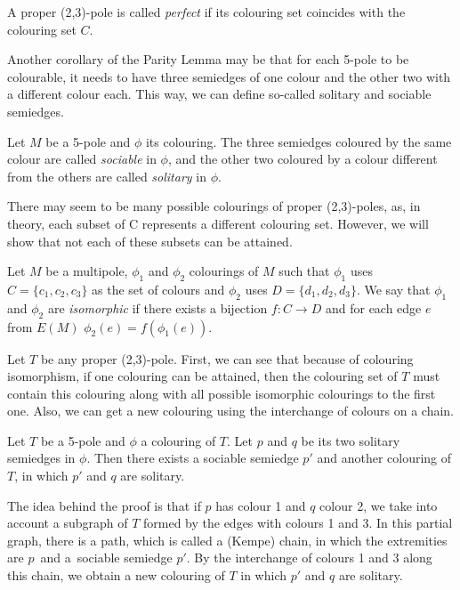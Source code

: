 \begin{definition}
	A proper (2,3)-pole is called \textit{perfect} if its colouring set coincides with the colouring set $C$.
\end{definition}

Another corollary of the Parity Lemma may be that for each 5-pole to be colourable, it needs to have three semiedges of one colour and the other two with a different colour each. This way, we can define so-called solitary and sociable semiedges.

\begin{definition}
	Let $M$ be a 5-pole and $\phi$ its colouring. The three semiedges coloured by the same colour are called \textit{sociable} in $\phi$, and the other two coloured by a colour different from the others are called \textit{solitary} in $\phi$.
\end{definition}

There may seem to be many possible colourings of proper (2,3)-poles, as, in theory, each subset of C represents a different colouring set. However, we will show that not each of these subsets can be attained.

Let $M$ be a multipole, $\phi_1$ and $\phi_2$ colourings of $M$ such that $\phi_1$ uses $C=\{c_1,c_2,c_3\}$ as the set of colours and $\phi_2$ uses $D=\{d_1,d_2,d_3\}$. We say that $\phi_1$ and $\phi_2$ are \textit{isomorphic} if there exists a bijection $f\colon C\rightarrow D$ and for each edge $e$ from $E(M)$ $\phi_2(e)=f(\phi_1(e))$.

Let $T$ be any proper (2,3)-pole. First, we can see that because of colouring isomorphism, if one colouring can be attained, then the colouring set of $T$ must contain this colouring along with all possible isomorphic colourings to the first one. Also, we can get a new colouring using the interchange of colours on a chain.

\begin{lemma}
	Let $T$ be a 5-pole and $\phi$ a colouring of $T$. Let $p$ and $q$ be its two solitary semiedges in $\phi$. Then there exists a sociable semiedge $p'$ and another colouring of $T$, in which $p'$ and $q$ are solitary.
	\label{lem:solitary}
\end{lemma}

The idea behind the proof is that if $p$ has colour 1 and $q$ colour 2, we take into account a subgraph of $T$ formed by the edges with colours 1 and 3. In this partial graph, there is a path, which is called a (Kempe) chain, in which the extremities are $p$~and a~sociable semiedge $p'$. By the interchange of colours 1 and 3 along this chain, we obtain a new colouring of $T$ in which $p'$ and $q$ are solitary.

